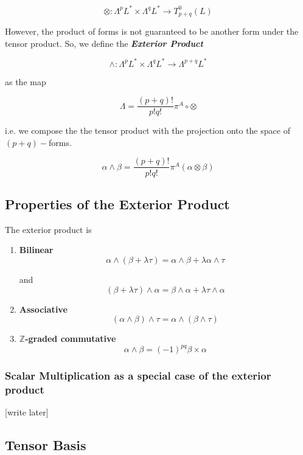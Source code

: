 \documentclass{article}
\begin{document}
\[ \otimes : \Lambda^p L^* \times \Lambda^q L^* \rightarrow T_{p+q}^0(L)   \]

However, the product of forms is not guaranteed to be another form under the tensor product. So, we define the \emph{\textbf{Exterior Product}}

\[  \wedge : \Lambda^p L^* \times \Lambda^q L^* \rightarrow \Lambda^{p + q} L^*   \]

as the map 

\[   \Lambda = \frac{(p+q)!}{p!q!} \pi^A \circ \otimes  \]

i.e. we compose the the tensor product with the projection onto the space of $(p+q)-$forms.

\[ \alpha \wedge \beta = \frac{(p+q)!}{p!q!} \pi^A(\alpha \otimes \beta) \]


\vskip 0.5cm
\subsection{Properties of the Exterior Product}

The exterior product is 
\begin{enumerate}
  \item \textbf{Bilinear}
  \[ \alpha \wedge (\beta + \lambda \tau) = \alpha \wedge \beta + \lambda \alpha \wedge \tau  \]

  and 
  \[ (\beta + \lambda \tau) \wedge \alpha = \beta  \wedge \alpha+ \lambda \tau \wedge \alpha  \]

  \vskip 0.5cm

  \item \textbf{Associative}
  \[ (\alpha \wedge \beta) \wedge \tau = \alpha \wedge (\beta \wedge \tau)  \]

  \vskip 0.5cm
  \item \textbf{$\mathbb{Z}$-graded commutative}
  \[ \alpha \wedge \beta = (-1)^{pq} \beta \times \alpha  \]
\end{enumerate}

\vskip 1cm
\subsubsection*{Scalar Multiplication as a special case of the exterior product}

[write later]

\vskip 1cm
\subsection{Tensor Basis}
\end{document}
